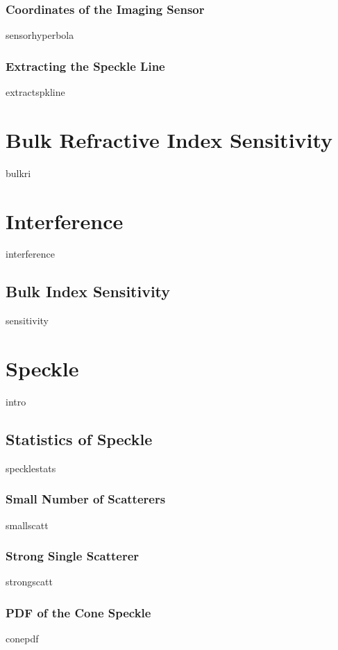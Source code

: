 \documentclass[a4paper,titlepage,onecolumn]{report}
\begin{document}
  \subsection{Coordinates of the Imaging Sensor}
  {sensorhyperbola}
  \subsection{Extracting the Speckle Line}
  {extractspkline}

\chapter{Bulk Refractive Index Sensitivity} \label{ch:bulkri}
{bulkri}

\chapter{Interference} \label{ch:interference}
{interference}
	\section{Bulk Index Sensitivity}
	{sensitivity}

\chapter{Speckle} \label{ch:speckle}
{intro}
 \section{Statistics of Speckle}
	{specklestats}
		\subsection{Small Number of Scatterers}
		{smallscatt}
		\subsection{Strong Single Scatterer}
		{strongscatt}
  \subsection{PDF of the Cone Speckle}
		{conepdf}
\end{document}
